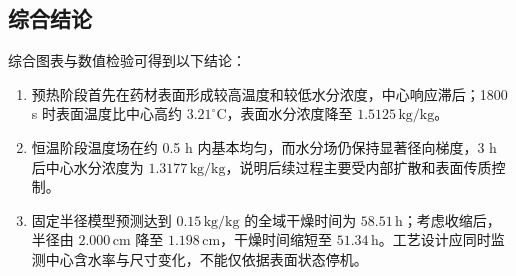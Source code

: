 \documentclass[withoutpreface,bwprint]{cumcm_thesis}
\begin{document}
\subsection{综合结论}
综合图表与数值检验可得到以下结论：
\begin{enumerate}[itemindent=2em]
\item 预热阶段首先在药材表面形成较高温度和较低水分浓度，中心响应滞后；1800 s 时表面温度比中心高约 \(3.21^\circ\mathrm{C}\)，表面水分浓度降至 \(1.5125\,\mathrm{kg/kg}\)。
\item 恒温阶段温度场在约 0.5 h 内基本均匀，而水分场仍保持显著径向梯度，3 h 后中心水分浓度为 \(1.3177\,\mathrm{kg/kg}\)，说明后续过程主要受内部扩散和表面传质控制。
\item 固定半径模型预测达到 \(0.15\,\mathrm{kg/kg}\) 的全域干燥时间为 \(58.51\,\mathrm{h}\)；考虑收缩后，半径由 \(2.000\,\mathrm{cm}\) 降至 \(1.198\,\mathrm{cm}\)，干燥时间缩短至 \(51.34\,\mathrm{h}\)。工艺设计应同时监测中心含水率与尺寸变化，不能仅依据表面状态停机。
\end{enumerate}



\nocite{*}
\end{document}
